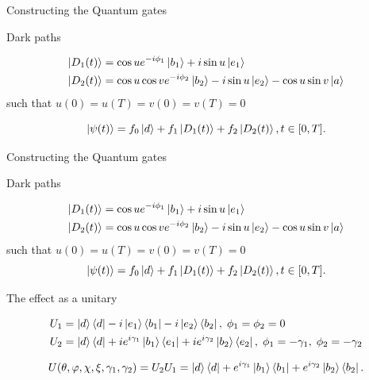 \documentclass[t]{beamer}
\begin{document}
\begin{frame}{Constructing the Quantum gates}
\begin{block}{Dark paths}

\begin{equation}
\begin{aligned}
\ket{D_1(t)} &= \cos u e^{-i\phi_1}\ket{b_1} + i\sin u \ket{e_1}
\\
\ket{D_2(t)} &= \cos u\cos v e^{-i\phi_2}\ket{b_2} - i\sin u \ket{e_2} - \cos u\sin v \ket{a}
\end{aligned}
\end{equation}
such that $u(0) = u(T) = v(0) = v(T) = 0$

\begin{equation}
\ket{\psi(t)} = f_0\ket{d} + f_1\ket{D_1(t)} + f_2\ket{D_2(t)}, t \in [0,T].
\end{equation}

\end{block}
\end{frame}



\begin{frame}{Constructing the Quantum gates}

\begin{block}{Dark paths}

\begin{equation}
\begin{aligned}
\ket{D_1(t)} &= \cos u e^{-i\phi_1}\ket{b_1} + i\sin u \ket{e_1}
\\
\ket{D_2(t)} &= \cos u\cos v e^{-i\phi_2}\ket{b_2} - i\sin u \ket{e_2} - \cos u\sin v \ket{a}
\end{aligned}
\end{equation}
such that $u(0) = u(T) = v(0) = v(T) = 0$
\begin{equation}
\ket{\psi(t)} = f_0\ket{d} + f_1\ket{D_1(t)} + f_2\ket{D_2(t)}, t \in [0,T].
\end{equation}

\end{block}

\begin{block}{The effect as a unitary}

\begin{equation}
\begin{aligned}&
U_1 = \ket{d}\bra{d} -i\ket{e_1}\bra{b_1} -i\ket{e_2}\bra{b_2},\; \phi_1 = \phi_2 = 0
\\&
U_2 = \ket{d}\bra{d} +ie^{i\gamma_1}\ket{b_1}\bra{e_1} +ie^{i\gamma_2}\ket{b_2}\bra{e_2},\; \phi_1 = -\gamma_1,\; \phi_2 = -\gamma_2
\end{aligned}
\end{equation}

\begin{equation}
U(\theta,\varphi,\chi,\xi,\gamma_1,\gamma_2) = U_2U_1 = \ket{d}\bra{d} + e^{i\gamma_1}\ket{b_1}\bra{b_1} + e^{i\gamma_2}\ket{b_2}\bra{b_2}.
\end{equation}

\end{block}

\end{frame}
\end{document}
